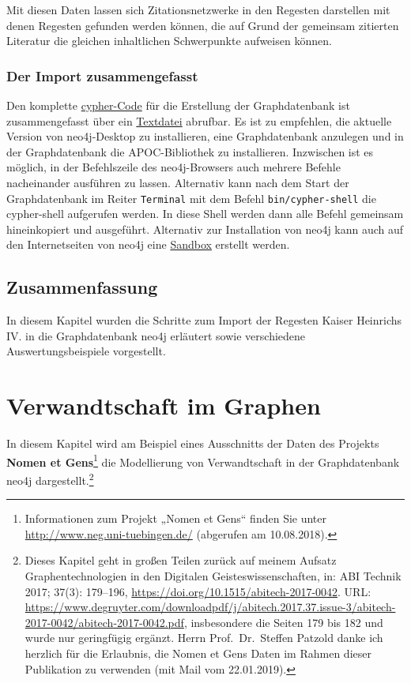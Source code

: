 \documentclass[ngerman,]{scrreprt}
\begin{document}
Mit diesen Daten lassen sich Zitationsnetzwerke in den Regesten darstellen mit denen Regesten gefunden werden können, die auf Grund der gemeinsam zitierten Literatur die gleichen inhaltlichen Schwerpunkte aufweisen können.

\hypertarget{der-import-zusammengefasst}{%
\subsection{Der Import zusammengefasst}\label{der-import-zusammengefasst}}

Den komplette \href{cypher/20_cypher-Datenbankerstellung.txt}{cypher-Code} für die Erstellung der Graphdatenbank ist zusammengefasst über ein \href{cypher/20_cypher-Datenbankerstellung.txt}{Textdatei} abrufbar. Es ist zu empfehlen, die aktuelle Version von neo4j-Desktop zu installieren, eine Graphdatenbank anzulegen und in der Graphdatenbank die APOC-Bibliothek zu installieren. Inzwischen ist es möglich, in der Befehlszeile des neo4j-Browsers auch mehrere Befehle nacheinander ausführen zu lassen. Alternativ kann nach dem Start der Graphdatenbank im Reiter \texttt{Terminal} mit dem Befehl \texttt{bin/cypher-shell} die cypher-shell aufgerufen werden. In diese Shell werden dann alle Befehl gemeinsam hineinkopiert und ausgeführt. Alternativ zur Installation von neo4j kann auch auf den Internetseiten von neo4j eine \href{https://neo4j.com/lp/try-neo4j-sandbox}{Sandbox} erstellt werden.

\hypertarget{zusammenfassung-2}{%
\section{Zusammenfassung}\label{zusammenfassung-2}}

In diesem Kapitel wurden die Schritte zum Import der Regesten Kaiser Heinrichs IV. in die Graphdatenbank neo4j erläutert sowie verschiedene Auswertungsbeispiele vorgestellt.

\hypertarget{verwandtschaft-im-graphen}{%
\chapter{Verwandtschaft im Graphen}\label{verwandtschaft-im-graphen}}

In diesem Kapitel wird am Beispiel eines Ausschnitts der Daten des Projekts \textbf{Nomen et Gens}\footnote{Informationen zum Projekt „Nomen et Gens`` finden Sie unter \url{http://www.neg.uni-tuebingen.de/} (abgerufen am 10.08.2018).} die Modellierung von Verwandtschaft in der Graphdatenbank neo4j dargestellt.\footnote{Dieses Kapitel geht in großen Teilen zurück auf meinem Aufsatz Graphentechnologien in den Digitalen Geisteswissenschaften, in: ABI Technik 2017; 37(3): 179--196, \url{https://doi.org/10.1515/abitech-2017-0042}. URL: \url{https://www.degruyter.com/downloadpdf/j/abitech.2017.37.issue-3/abitech-2017-0042/abitech-2017-0042.pdf}, insbesondere die Seiten 179 bis 182 und wurde nur geringfügig ergänzt. Herrn Prof.~Dr.~Steffen Patzold danke ich herzlich für die Erlaubnis, die Nomen et Gens Daten im Rahmen dieser Publikation zu verwenden (mit Mail vom 22.01.2019).}
\end{document}
